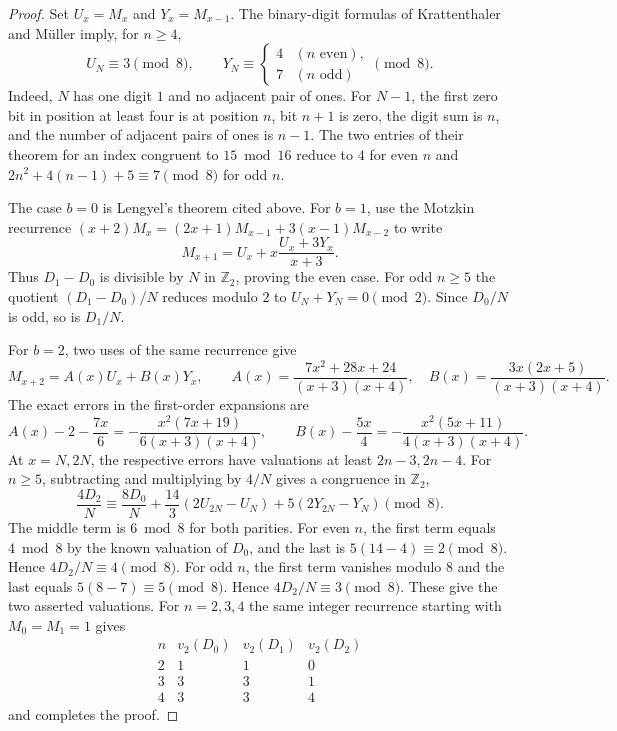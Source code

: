 \documentclass[11pt,a4paper]{article}
\begin{document}
\begin{proof}
Set $U_x=M_x$ and $Y_x=M_{x-1}$. The binary-digit formulas of
Krattenthaler and M\"uller \cite[Theorem~11]{km18} imply, for $n\ge4$,
\[
 U_N\equiv3\pmod8,\qquad
 Y_N\equiv\begin{cases}4& (n\text{ even}),\\7&(n\text{ odd})\end{cases}
 \pmod8 .
\]
Indeed, $N$ has one digit $1$ and no adjacent pair of ones. For
$N-1$, the first zero bit in position at least four is at position
$n$, bit $n+1$ is zero, the digit sum is $n$, and the number of
adjacent pairs of ones is $n-1$. The two entries of their theorem
for an index congruent to $15\bmod16$ reduce to $4$ for even $n$
and $2n^2+4(n-1)+5\equiv7\pmod8$ for odd $n$.

The case $b=0$ is Lengyel's theorem cited above. For $b=1$, use the
Motzkin recurrence $(x+2)M_x=(2x+1)M_{x-1}+3(x-1)M_{x-2}$ to write
\[
 M_{x+1}=U_x+x\frac{U_x+3Y_x}{x+3}.
\]
Thus $D_1-D_0$ is divisible by $N$ in $\mathbb Z_2$, proving the even
case. For odd $n\ge5$ the quotient $(D_1-D_0)/N$ reduces modulo $2$
to $U_N+Y_N=0\pmod2$. Since $D_0/N$ is odd, so is $D_1/N$.

For $b=2$, two uses of the same recurrence give
\[
 M_{x+2}=A(x)U_x+B(x)Y_x,\qquad
 A(x)=\frac{7x^2+28x+24}{(x+3)(x+4)},\quad
 B(x)=\frac{3x(2x+5)}{(x+3)(x+4)} .
\]
The exact errors in the first-order expansions are
\[
 A(x)-2-\frac{7x}{6}=-\frac{x^2(7x+19)}{6(x+3)(x+4)},
 \qquad B(x)-\frac{5x}{4}=-\frac{x^2(5x+11)}{4(x+3)(x+4)}.
\]
At $x=N,2N$, the respective errors have valuations at least
$2n-3,2n-4$. For $n\ge5$, subtracting and multiplying by $4/N$ gives
a congruence in $\mathbb Z_2$,
\[
 \frac{4D_2}{N}\equiv \frac{8D_0}{N}
 +\frac{14}{3}(2U_{2N}-U_N)+5(2Y_{2N}-Y_N)\pmod8 .
\]
The middle term is $6\bmod8$ for both parities. For even $n$, the
first term equals $4\bmod8$ by the known valuation of $D_0$, and the
last is $5(14-4)\equiv2\pmod8$. Hence $4D_2/N\equiv4\pmod8$.
For odd $n$, the first term vanishes modulo $8$ and the last equals
$5(8-7)\equiv5\pmod8$. Hence $4D_2/N\equiv3\pmod8$.
These give the two asserted valuations. For $n=2,3,4$ the same
integer recurrence starting with $M_0=M_1=1$ gives
\[
\begin{array}{c|rrr}
n&v_2(D_0)&v_2(D_1)&v_2(D_2)\\\hline
2&1&1&0\\3&3&3&1\\4&3&3&4
\end{array}
\]
and completes the proof.
\end{proof}
\end{document}
